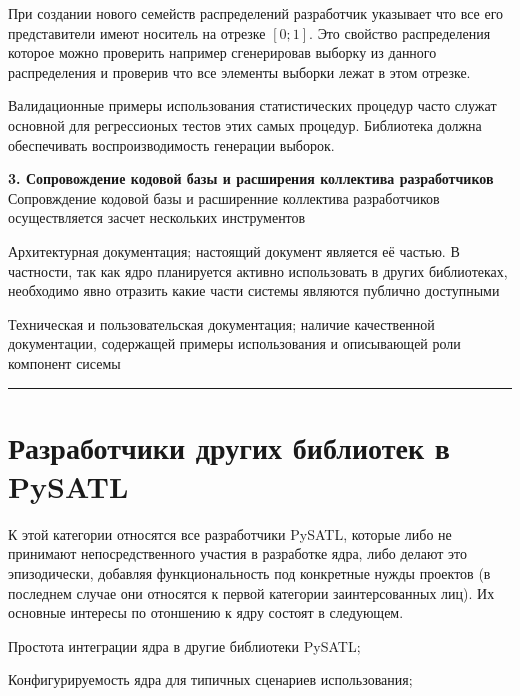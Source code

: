 \begin{example}
При создании нового семейств распределений разработчик указывает что все его представители имеют носитель на отрезке $[0; 1]$. Это свойство распределения которое можно проверить например сгенерировав выборку из данного распределения и проверив что все элементы выборки лежат в этом отрезке.
\end{example}


\begin{example}
Валидационные примеры использования статистических процедур часто служат основной для регрессионых тестов этих самых процедур. Библиотека должна обеспечивать воспроизводимость генерации выборок.
\end{example}

\textbf{3. Сопровождение кодовой базы и расширения коллектива разработчиков}\\
Сопровждение кодовой базы и расширенние коллектива разработчиков осуществляется засчет нескольких инструментов
\begin{itemizecmp}
    \item Архитектурная документация; настоящий документ является её частью. В частности, так как ядро планируется активно использовать в других библиотеках, необходимо явно отразить какие части системы являются публично доступными
    \item Техническая и пользовательская документация; наличие качественной документации, содержащей примеры использования и описывающей роли компонент сисемы
\end{itemizecmp}

\noindent\rule{\textwidth}{0.5pt}
\section{Разработчики других библиотек в PySATL}

К этой категории относятся все разработчики PySATL, которые либо не принимают непосредственного участия в разработке ядра, либо делают это эпизодически, добавляя функциональность под конкретные нужды проектов (в последнем случае они относятся к первой категории заинтерсованных лиц). Их основные интересы по отоншению к ядру состоят в следующем.
\begin{enumeratecmp}
    \item Простота интеграции ядра в другие библиотеки PySATL;
    \item Конфигурируемость ядра для типичных сценариев использования; 
\end{enumeratecmp}

